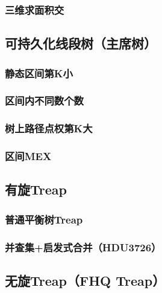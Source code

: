 \documentclass[twoside,a4paper]{article}
\begin{document}
\subsubsection{三维求面积交}



\subsection{可持久化线段树（主席树）}

\subsubsection{静态区间第K小}


\subsubsection{区间内不同数个数}


\subsubsection{树上路径点权第K大}


\subsubsection{区间MEX}


\subsection{有旋Treap}
\subsubsection{普通平衡树Treap}


\subsubsection{并查集+启发式合并（HDU3726）}



\subsection{无旋Treap（FHQ Treap）}
\end{document}
